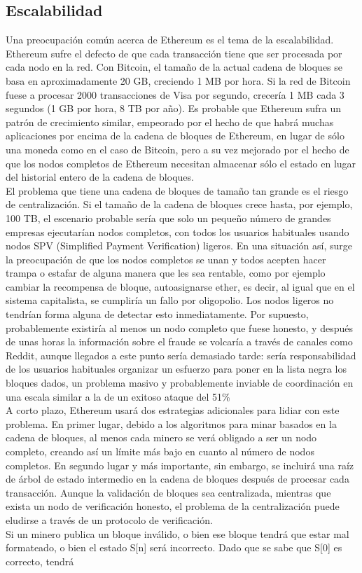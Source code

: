 \documentclass[11pt,a4paper]{article}
\begin{document}
\subsection{Escalabilidad}
\label{sec:escalabilidad}

Una preocupación común acerca de Ethereum es el tema de la escalabilidad. Ethereum sufre el defecto de que cada transacción tiene que ser procesada por cada nodo en la red. Con Bitcoin, el tamaño de la actual cadena de bloques se basa en aproximadamente 20 GB, creciendo 1 MB por hora. Si la red de Bitcoin fuese a procesar 2000 transacciones de Visa por segundo, crecería 1 MB cada 3 segundos (1 GB por hora, 8 TB por año). Es probable que Ethereum sufra un patrón de crecimiento similar, empeorado por el hecho de que habrá muchas aplicaciones por encima de la cadena de bloques de Ethereum, en lugar de sólo una moneda como en el caso de Bitcoin, pero a su vez mejorado por el hecho de que los nodos completos de Ethereum necesitan almacenar sólo el estado en lugar del historial entero de la cadena de bloques.\\


El problema que tiene una cadena de bloques de tamaño tan grande es el riesgo de centralización. Si el tamaño de la cadena de bloques crece hasta, por ejemplo, 100 TB, el escenario probable sería que solo un pequeño número de grandes empresas ejecutarían nodos completos, con todos los usuarios habituales usando nodos SPV (Simplified Payment Verification) ligeros. En una situación así, surge la preocupación de que los nodos completos se unan y todos acepten hacer trampa o estafar de alguna manera que les sea rentable, como por ejemplo cambiar la recompensa de bloque, autoasignarse ether, es decir, al igual que en el sistema capitalista, se cumpliría un fallo por oligopolio. Los nodos ligeros no tendrían forma alguna de detectar esto inmediatamente. Por supuesto, probablemente existiría al menos un nodo completo que fuese honesto, y después de unas horas la información sobre el fraude se volcaría a través de canales como Reddit, aunque llegados a este punto sería demasiado tarde: sería responsabilidad de los usuarios habituales organizar un esfuerzo para poner en la lista negra los bloques dados, un problema masivo y probablemente inviable de coordinación en una escala similar a la de un exitoso ataque del 51\%\\

A corto plazo, Ethereum usará dos estrategias adicionales para lidiar con este problema. En primer lugar, debido a los algoritmos para minar basados en la cadena de bloques, al menos cada minero se verá obligado a ser un nodo completo, creando así un límite más bajo en cuanto al número de nodos completos. En segundo lugar y más importante, sin embargo, se incluirá una raíz de árbol de estado intermedio en la cadena de bloques después de procesar cada transacción. Aunque la validación de bloques sea centralizada, mientras que exista un nodo de verificación honesto, el problema de la centralización puede eludirse a través de un protocolo de verificación. \\ 
Si un minero publica un bloque inválido, o bien ese bloque tendrá que estar mal
formateado, o bien el estado S[n] será incorrecto. Dado que se sabe que S[0] es correcto, tendrá
\end{document}
